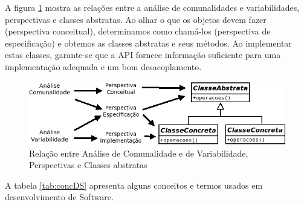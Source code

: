 \documentclass[
	11pt,				%
	openright,
	twoside,			%
	a4paper,			%
	english,			%
	french,
	brazil,				%
	sumario=tradicional
	]{abntex2}
\begin{document}
A figura \ref{fig:cvaPersp} mostra as relações entre a análise de comunalidades e variabilidades, perspectivas e classes abstratas. Ao olhar o que os objetos devem fazer (perspectiva conceitual), determinamos como chamá-los (perspectiva de especificação) e obtemos as classes abstratas e seus métodos. Ao implementar estas classes, garante-se que a API fornece informação suficiente para uma implementação adequada e um bom desacoplamento.

\begin{figure}[h]
\begin{center}
\includegraphics[scale=0.4]{cva_persp.png}
\caption{Relação entre Análise de Comunalidade e de Variabilidade, Perspectivas e Classes abstratas} \label{fig:cvaPersp}
\end{center}
\end{figure}

A tabela \ref{tab:concDS} apresenta alguns conceitos e termos usados em desenvolvimento de Software.
\end{document}
